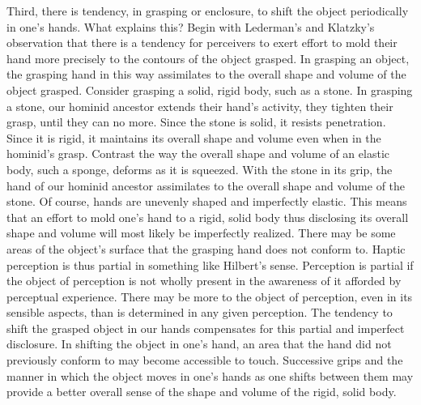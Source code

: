 Third, there is tendency, in grasping or enclosure, to shift the object periodically in one's hands. What explains this? Begin with Lederman's and Klatzky's \citeyearpar{Lederman:1987fr} observation that there is a tendency for perceivers to exert effort to mold their hand more precisely to the contours of the object grasped. In grasping an object, the grasping hand in this way assimilates to the overall shape and volume of the object grasped. Consider grasping a solid, rigid body, such as a stone. In grasping a stone, our hominid ancestor extends their hand's activity, they tighten their grasp, until they can no more. Since the stone is solid, it resists penetration. Since it is rigid, it maintains its overall shape and volume even when in the hominid's grasp. Contrast the way the overall shape and volume of an elastic body, such a sponge, deforms as it is squeezed. With the stone in its grip, the hand of our hominid ancestor assimilates to the overall shape and volume of the stone. Of course, hands are unevenly shaped and imperfectly elastic. This means that an effort to mold one's hand to a rigid, solid body thus disclosing its overall shape and volume will most likely be imperfectly realized. There may be some areas of the object's surface that the grasping hand does not conform to. Haptic perception is thus partial in something like Hilbert's \citeyearpar{Hilbert:1987jq} sense. Perception is partial if the object of perception is not wholly present in the awareness of it afforded by perceptual experience. There may be more to the object of perception, even in its sensible aspects, than is determined in any given perception. The tendency to shift the grasped object in our hands compensates for this partial and imperfect disclosure. In shifting the object in one's hand, an area that the hand did not previously conform to may become accessible to touch. Successive grips and the manner in which the object moves in one's hands as one shifts between them may provide a better overall sense of the shape and volume of the rigid, solid body. 


